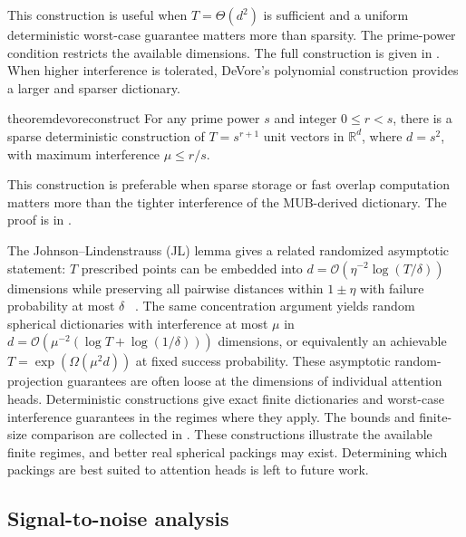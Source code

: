 \documentclass{article}
\newcommand{\1}{\bm{1}}
\def\gO{{\mathcal{O}}}
\newcommand{\R}{\mathbb{R}}
\theoremstyle{definition}
\begin{document}
This construction is useful when $T=\Theta(d^2)$ is sufficient and a uniform deterministic worst-case guarantee matters more than sparsity. The prime-power condition restricts the available dimensions. The full construction is given in .
When higher interference is tolerated, DeVore's polynomial construction provides a larger and sparser dictionary.

\begin{restatable}{theorem}{devoreconstruct}
  \label{thm:devore}
  For any prime power $s$ and integer $0\le r<s$, there is a sparse deterministic construction of
  $T=s^{r+1}$ unit vectors in $\R^d$, where $d=s^2$, with maximum interference
  $\mu\le r/s$.
\end{restatable}
This construction is preferable when sparse storage or fast overlap computation matters more than the tighter interference of the MUB-derived dictionary. The proof is in .

The Johnson--Lindenstrauss (JL) lemma gives a related randomized asymptotic statement: $T$ prescribed points can be embedded into
$d=\gO(\eta^{-2}\log(T/\delta))$ dimensions while preserving all pairwise distances within
$1\pm\eta$ with failure probability at most $\delta$
~\citep{johnson84extensions,achlioptas03database}. The same concentration argument yields random
spherical dictionaries with interference at most $\mu$ in
$d=\gO(\mu^{-2}(\log T+\log(1/\delta)))$ dimensions, or equivalently an achievable
$T=\exp(\Omega(\mu^2d))$ at fixed success probability.
These asymptotic random-projection guarantees are often loose at the dimensions of individual
attention heads. Deterministic constructions give exact finite dictionaries and worst-case
interference guarantees in the regimes where they apply. The bounds and finite-size comparison are
collected in . These constructions illustrate the
available finite regimes, and better real spherical packings may exist. Determining which packings are best suited to attention heads is left to future work.

\subsection{Signal-to-noise analysis}
\label{ssec:snr}
\end{document}
